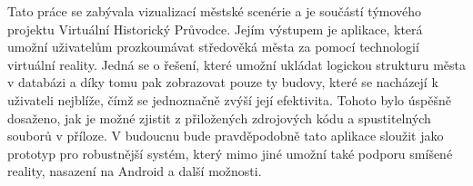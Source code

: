 \documentclass[thesis=B,czech]{FITthesis}[2012/06/26]
\begin{document}
\begin{conclusion}
	   
    Tato práce se zabývala vizualizací městské scenérie a je součástí týmového projektu Virtuální Historický Průvodce. Jejím výstupem je aplikace, která umožní uživatelům prozkoumávat středověká města za pomocí technologií virtuální reality. Jedná se o řešení, které umožní ukládat logickou strukturu města v databázi a díky tomu pak zobrazovat pouze ty budovy, které se nacházejí k uživateli nejblíže, čímž se jednoznačně zvýší její efektivita. Tohoto bylo úspěšně dosaženo, jak je možné zjistit z přiložených zdrojových kódu a spustitelných souborů v příloze.
     V budoucnu bude pravděpodobně tato aplikace sloužit jako prototyp pro robustnější systém, který mimo jiné umožní také podporu smíšené reality, nasazení na Android a další možnosti.
\end{conclusion}

%
%
\end{document}
